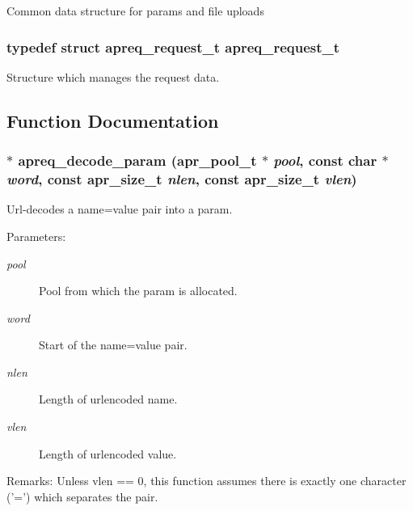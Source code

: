 Common data structure for params and file uploads 
\subsubsection{\setlength{\rightskip}{0pt plus 5cm}typedef struct apreq\_\-request\_\-t  apreq\_\-request\_\-t}\label{group__params_a1}


Structure which manages the request data. 

\subsection{Function Documentation}
\subsubsection{$\ast$ apreq\_\-decode\_\-param ({\bf apr\_\-pool\_\-t} $\ast$ {\em pool}, const char $\ast$ {\em word}, const {\bf apr\_\-size\_\-t} {\em nlen}, const {\bf apr\_\-size\_\-t} {\em vlen})}\label{group__params_a6}


Url-decodes a name=value pair into a param. \begin{Desc}
\item[Parameters:]
\begin{description}
\item[{\em pool}]Pool from which the param is allocated. \item[{\em word}]Start of the name=value pair. \item[{\em nlen}]Length of urlencoded name. \item[{\em vlen}]Length of urlencoded value. \end{description}
\end{Desc}
\begin{Desc}
\item[Remarks:]Unless vlen == 0, this function assumes there is exactly one character ('=') which separates the pair. \end{Desc}
